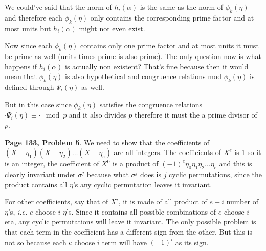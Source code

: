 \documentclass[aps,preprint,preprintnumbers,nofootinbib,showpacs,prd]{revtex4-1}
\newcommand{\ie}{{\it i.e.} }
\begin{document}
We could've said that the norm of $h_i(\alpha)$ is the same as the norm of $\phi_k(\eta)$ and therefore each $\phi_k(\eta)$ only contains the corresponding prime factor and at most units but $h_i(\alpha)$ might not even exist. 

Now since each $\phi_k(\eta)$ contains only one prime factor and at most units it must be prime as well (units times prime is also prime). The only question now is what happens if $h_i(\alpha)$ is actually non existent? That's fine because then it would mean that $\phi_k(\eta)$ is also hypothetical and congruence relations mod $\phi_k(\eta)$ is defined through $\Psi_i(\eta)$ as well.

But in this case since $\phi_k(\eta)$ satisfies the congruence relations $\cdot \Psi_i(\eta) \equiv \cdot \mod{p}$ and it also divides $p$ therefore it must the a prime divisor of $p$.



{\bf Page 133, Problem 5}. We need to show that the coefficients of $(X - \eta_1)(X - \eta_2) \dots (X - \eta_e)$ are all integers. The coefficients of $X^e$ is 1 so it is an integer, the coefficient of $X^0$ is a product of $(-1)^e\eta_0\eta_1\eta_2 \dots \eta_e$ and this is clearly invariant under $\sigma^j$ because what $\sigma^j$ does is $j$ cyclic permutations, since the product contains all $\eta$'s any cyclic permutation leaves it invariant.

For other coefficients, say that of $X^i$, it is made of all product of $e - i$ number of $\eta$'s, \ie $e$ choose $i$ $\eta$'s. Since it contains all possible combinations of $e$ choose $i$ eta, any cyclic permutations will leave it invariant. The only possible problem is that each term in the coefficient has a different sign from the other. But this is not so because each $e$ choose $i$ term will have $(-1)^i$ as its sign.
\end{document}
